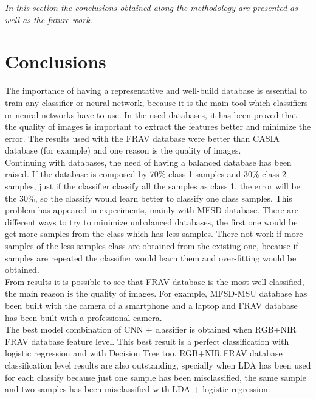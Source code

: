 \minitoc
\mtcskip

\begin{small}
\emph{In this section the conclusions obtained along the methodology are presented as well as the future work.\\}
\end{small}

\section{Conclusions}
The importance of having a representative and well-build database is essential to train any classifier or neural network, because it is the main tool which classifiers or neural networks have to use. In the used databases, it has been proved that the quality of images is important to extract the features better and minimize the error. The results used with the FRAV database were better than CASIA database (for example) and one reason is the quality of images.\\
Continuing with databases, the need of having a balanced database has been raised. If the database is composed by 70\% class 1 samples and 30\% class 2 samples, just if the classifier classify all the samples as class 1, the error will be the 30\%, so the classify would learn better to classify one class samples. This problem has appeared in experiments, mainly with MFSD database. There are different ways to try to minimize unbalanced databases, the first one would be get more samples from the class which has less samples. There not work if more samples of the less-samples class are obtained from the existing one, because if samples are repeated the classifier would learn them and over-fitting would be obtained.\\

From results it is possible to see that FRAV database is the most well-classified, the main reason is the quality of images. For example, MFSD-MSU database has been built with the camera of a smartphone and a laptop and FRAV database has been built with a professional camera.\\

The best model combination of CNN + classifier is obtained when RGB+NIR FRAV database feature level. This best result is a perfect classification with logistic regression and with Decision Tree too. RGB+NIR FRAV database classification level results are also outstanding, specially when LDA has been used for each classify because just one sample has been misclassified, the same sample and two samples has been misclassified with LDA + logistic regression.\\

